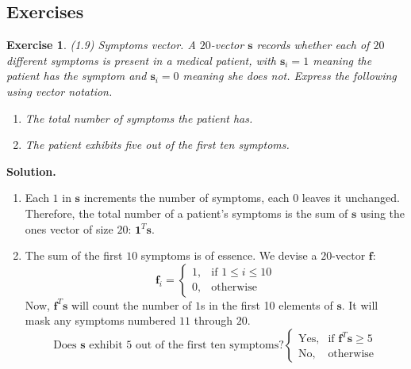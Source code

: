 \documentclass[11pt]{book}
\theoremstyle{definition}
\theoremstyle{plain}
\newtheorem{exercise}{Exercise}[chapter]
\theoremstyle{problemstyle}
\theoremstyle{remark}
\theoremstyle{definition}
\begin{document}
\subsection*{Exercises}
\begin{exercise}
    (1.9) Symptoms vector. A $20$-vector $\boldsymbol{s}$ records whether each of $20$ different symptoms is present in a medical patient, with $\boldsymbol{s}_i=1$ meaning the patient has the symptom and $\boldsymbol{s}_i=0$
meaning she does not. Express the following using vector notation.
\begin{enumerate}[label=(\alph*)]
  \item The total number of symptoms the patient has.
  \item The patient exhibits five out of the first ten symptoms.
\end{enumerate}
\end{exercise}
\textbf{Solution.}
\begin{enumerate}[label=(\alph*)]
        \item Each $1$ in $\boldsymbol{s}$ increments the number of symptoms, each $0$ leaves it unchanged. Therefore, the total number of a patient's symptoms is the sum of $\boldsymbol{s}$ using the ones vector of size $20$: $\boldsymbol{1}^T\boldsymbol{s}$.
    \item The sum of the first $10$ symptoms is of essence. We devise a $20$-vector $\boldsymbol{f}$: 
            \[
                \boldsymbol{f}_i=
               \begin{cases}
                   1,&\text{if $1\leq i\leq 10$}\\
                   0,&\text{otherwise}
               \end{cases}
            \]
         Now, $\boldsymbol{f}^T\boldsymbol{s}$ will count the number of $1$s in the first 10 elements of $\boldsymbol{s}$. It will mask any symptoms numbered $11$ through $20$.
            \[
                \text{Does $\boldsymbol{s}$ exhibit 5 out of the first ten symptoms?}
                \begin{cases}
                    \text{Yes},&\text{if $\boldsymbol{f}^T\boldsymbol{s}\geq 5$}\\
                    \text{No},&\text{otherwise}
                \end{cases}
            \]
    \end{enumerate}
\end{document}
